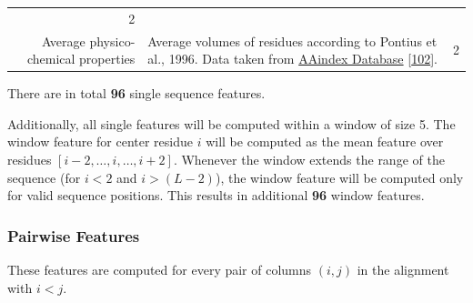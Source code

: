 \documentclass[12pt,a4paper,twoside]{book}
\theoremstyle{definition}
\theoremstyle{definition}
\theoremstyle{remark}
\begin{document}
\begin{longtable}[]{@{}rlc@{}}
\begin{minipage}[t]{0.18\columnwidth}
2\strut
\end{minipage}\tabularnewline
\begin{minipage}[t]{0.23\columnwidth}\raggedleft\strut
Average physico-chemical properties\strut
\end{minipage} & \begin{minipage}[t]{0.50\columnwidth}\raggedright\strut
Average volumes of residues according to Pontius et al., 1996. Data
taken from
\href{http://www.genome.jp/dbget-bin/www_bget?aaindex:PONJ960101}{AAindex
Database} {[}\protect\hyperlink{ref-Kawashima2008}{102}{]}.\strut
\end{minipage} & \begin{minipage}[t]{0.18\columnwidth}\centering\strut
2\strut
\end{minipage}\tabularnewline
\bottomrule
\end{longtable}

There are in total \textbf{96} single sequence features.

Additionally, all single features will be computed within a window of
size 5. The window feature for center residue \(i\) will be computed as
the mean feature over residues \([i-2, \ldots, i, \ldots, i+2]\).
Whenever the window extends the range of the sequence (for \(i\!<\!2\)
and \(i\!>\!(L-2)\)), the window feature will be computed only for valid
sequence positions. This results in additional \textbf{96} window
features.

\subsubsection{Pairwise Features}\label{seq-features-pairwise}

These features are computed for every pair of columns \((i, j)\) in the
alignment with \(i<j\).
\end{document}
